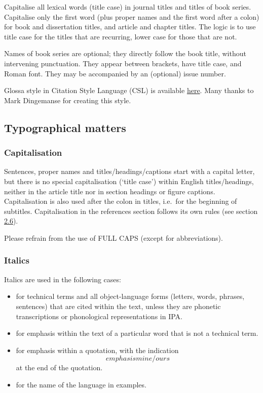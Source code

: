 \documentclass[cm,linguex]{glossa}
\begin{document}
Capitalise all lexical words (title case) in journal titles and titles
of book series. Capitalise only the first word (plus proper names and
the first word after a colon) for book and dissertation titles, and
article and chapter titles. The logic is to use title case for the
titles that are recurring, lower case for those that are not.

Names of book series are optional; they directly follow the book title,
without intervening punctuation. They appear between brackets, have
title case, and Roman font. They may be accompanied by an (optional)
issue number.

Glossa style in Citation Style Language (CSL) is available
\href{https://www.zotero.org/styles?q=Glossa}{here}. Many thanks to Mark
Dingemanse for creating this style.

\hypertarget{typographical-matters}{%
\subsection{Typographical matters}\label{typographical-matters}}

\hypertarget{capitalisation}{%
\subsubsection{Capitalisation}\label{capitalisation}}

Sentences, proper names and titles/headings/captions start with a
capital letter, but there is no special capitalisation (`title case')
within English titles/headings, neither in the article title nor in
section headings or figure captions. Capitalisation is also used after
the colon in titles, i.e.~for the beginning of subtitles. Capitalisation
in the references section follows its own rules (see section
\protect\hyperlink{sec:refs}{2.6}).

Please refrain from the use of FULL CAPS (except for abbreviations).

\hypertarget{italics}{%
\subsubsection{Italics}\label{italics}}

Italics are used in the following cases:

\begin{itemize}
\item
  for technical terms and all object-language forms (letters, words,
  phrases, sentences) that are cited within the text, unless they are
  phonetic transcriptions or phonological representations in IPA.
\item
  for emphasis within the text of a particular word that is not a
  technical term.
\item
  for emphasis within a quotation, with the indication \[emphasis
  mine/ours\] at the end of the quotation.
\item
  for the name of the language in examples.
\end{itemize}
\end{document}
